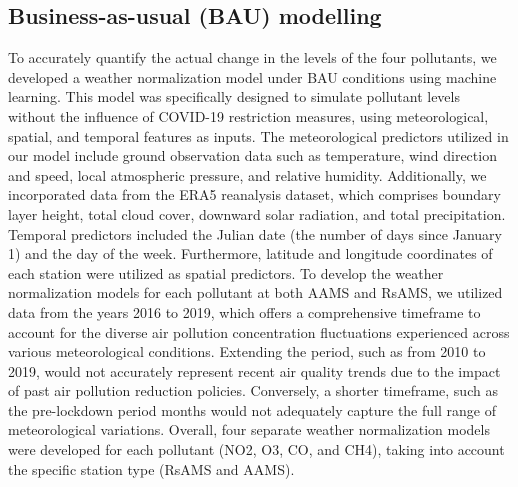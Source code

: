 \subsection{Business-as-usual (BAU) modelling}
To accurately quantify the actual change in the levels of the four pollutants, we developed a weather normalization model under BAU conditions using machine learning. This model was specifically designed to simulate pollutant levels without the influence of COVID-19 restriction measures, using meteorological, spatial, and temporal features as inputs. The meteorological predictors utilized in our model include ground observation data such as temperature, wind direction and speed, local atmospheric pressure, and relative humidity. Additionally, we incorporated data from the ERA5 reanalysis dataset, which comprises boundary layer height, total cloud cover, downward solar radiation, and total precipitation. Temporal predictors included the Julian date (the number of days since January 1) and the day of the week. Furthermore, latitude and longitude coordinates of each station were utilized as spatial predictors. To develop the weather normalization models for each pollutant at both AAMS and RsAMS, we utilized data from the years 2016 to 2019, which offers a comprehensive timeframe to account for the diverse air pollution concentration fluctuations experienced across various meteorological conditions. Extending the period, such as from 2010 to 2019, would not accurately represent recent air quality trends due to the impact of past air pollution reduction policies. Conversely, a shorter timeframe, such as the pre-lockdown period months would not adequately capture the full range of meteorological variations. Overall, four separate weather normalization models were developed for each pollutant (NO2, O3, CO, and CH4), taking into account the specific station type (RsAMS and AAMS). \par

